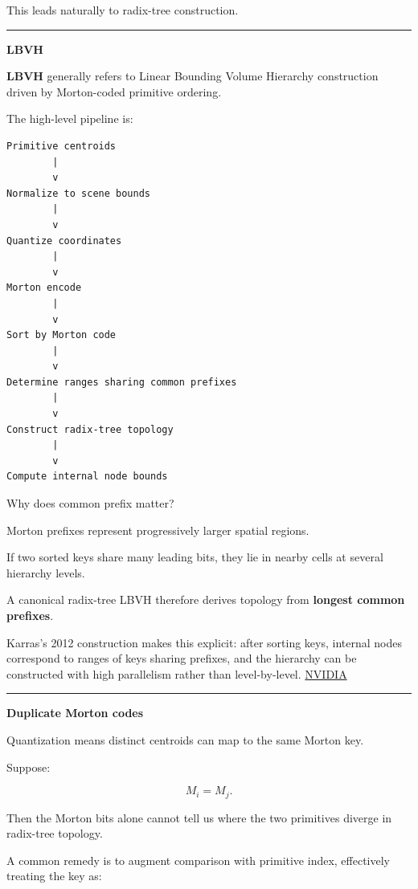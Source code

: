 This leads naturally to radix-tree construction.

\begin{center}\rule{0.5\linewidth}{0.5pt}\end{center}

\textbf{LBVH}

\textbf{LBVH} generally refers to Linear Bounding Volume Hierarchy construction driven by Morton-coded primitive ordering.

The high-level pipeline is:

\begin{verbatim}
Primitive centroids
        |
        v
Normalize to scene bounds
        |
        v
Quantize coordinates
        |
        v
Morton encode
        |
        v
Sort by Morton code
        |
        v
Determine ranges sharing common prefixes
        |
        v
Construct radix-tree topology
        |
        v
Compute internal node bounds
\end{verbatim}

Why does common prefix matter?

Morton prefixes represent progressively larger spatial regions.

If two sorted keys share many leading bits, they lie in nearby cells at several hierarchy levels.

A canonical radix-tree LBVH therefore derives topology from \textbf{longest common prefixes}.

Karras's 2012 construction makes this explicit: after sorting keys, internal nodes correspond to ranges of keys sharing prefixes, and the hierarchy can be constructed with high parallelism rather than level-by-level. \href{https://research.nvidia.com/publication/2012-06_maximizing-parallelism-construction-bvhs-octrees-and-k-d-trees?utm_source=chatgpt.com}{NVIDIA}

\begin{center}\rule{0.5\linewidth}{0.5pt}\end{center}

\textbf{Duplicate Morton codes}

Quantization means distinct centroids can map to the same Morton key.

Suppose:

\[
M_i=M_j.
\]

Then the Morton bits alone cannot tell us where the two primitives diverge in radix-tree topology.

A common remedy is to augment comparison with primitive index, effectively treating the key as:

